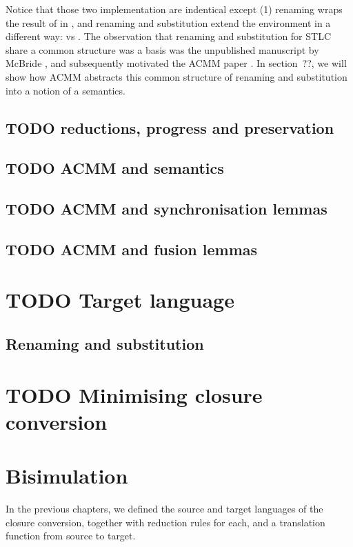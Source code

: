 \documentclass[bsc,frontabs,twoside,singlespacing,parskip,deptreport]{infthesis}
\theoremstyle{definition}
\begin{document}
Notice that those two implementation are indentical except (1)
renaming wraps the result of  in , and renaming
and substitution extend the environment in a different way:  vs . The observation that
renaming and substitution for STLC share a common structure was a
basis was the unpublished manuscript by McBride
\cite{mcbride2005type}, and subsequently motivated the ACMM paper
\cite{DBLP:conf/cpp/Allais0MM17}. In section~??, we will show how ACMM
abstracts this common structure of renaming and substitution into a
notion of a semantics.

\section{TODO reductions, progress and preservation}

\section{TODO ACMM and semantics}

\section{TODO ACMM and synchronisation lemmas}

\section{TODO ACMM and fusion lemmas}

\chapter{TODO Target language}

\section{Renaming and substitution}

\chapter{TODO Minimising closure conversion}

\chapter{Bisimulation}

In the previous chapters, we defined the source and target languages
of the closure conversion, together with reduction rules for each, and
a translation function from source to target.
\end{document}
